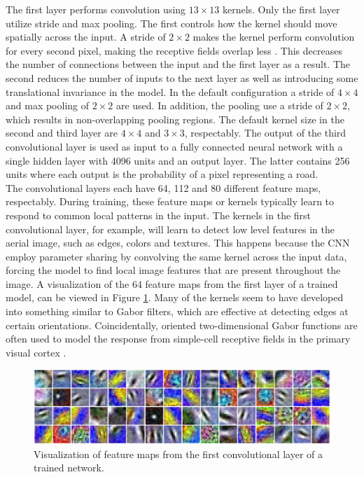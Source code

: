 The first layer performs convolution using $13 \times 13$ kernels. Only the first layer utilize stride and max pooling. The first controls how the kernel should move spatially across the input. A stride of $2 \times 2$ makes the kernel perform convolution for every second pixel, making the receptive fields overlap less . This decreases the number of connections between the input and the first layer as a result. The second reduces the number of inputs to the next layer as well as introducing some translational invariance in the model. In the default configuration a stride of $4 \times 4$ and max pooling of $2 \times 2$ are used. In addition, the pooling use a stride of $2 \times 2$, which results in non-overlapping pooling regions. The default kernel size in the second and third layer are $4 \times 4$ and $3 \times 3$, respectably. The output of the third convolutional layer is used as input to a fully connected neural network with a single hidden layer with 4096 units and an output layer. The latter contains 256 units where each output is the probability of a pixel representing a road.\\


The convolutional layers each have 64, 112 and 80 different feature maps, respectably. During training, these feature maps or kernels typically learn to respond to common local patterns in the input. The kernels in the first convolutional layer, for example, will learn to detect low level features in the aerial image, such as edges, colors and textures. This happens because the \ac{CNN} employ parameter sharing by convolving the same kernel across the input data, forcing the model to find local image features that are present throughout the image. A visualization of the 64 feature maps from the first layer of a trained model, can be viewed in Figure \ref{fig:convoluional_first_layer_visualization}. Many of the kernels seem to have developed into something similar to Gabor filters, which are effective at detecting edges at certain orientations. Coincidentally, oriented two-dimensional Gabor functions are often used to model the response from simple-cell receptive fields in the primary visual cortex \citep{Ringach_gabor_spatial}. \\


\begin{figure}
\begin{center}
\includegraphics[width=1\columnwidth]{figs/network/Filter_unblurred.png}
\caption[Visualization of filter map]{Visualization of feature maps from the first convolutional layer of a trained network.}
\label{fig:convoluional_first_layer_visualization}
\end{center}
\end{figure}

